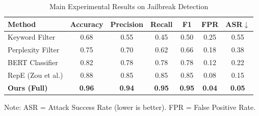 
\begin{table}[h]
\centering
\caption{Main Experimental Results on Jailbreak Detection}
\label{tab:main_results}
\begin{tabular}{lcccccc}
\toprule
\textbf{Method} & \textbf{Accuracy} & \textbf{Precision} & \textbf{Recall} & \textbf{F1} & \textbf{FPR} & \textbf{ASR$\downarrow$} \\
\midrule
Keyword Filter & 0.68 & 0.55 & 0.45 & 0.50 & 0.25 & 0.55 \\
Perplexity Filter & 0.75 & 0.70 & 0.62 & 0.66 & 0.18 & 0.38 \\
BERT Classifier & 0.82 & 0.78 & 0.78 & 0.78 & 0.12 & 0.22 \\
RepE (Zou et al.) & 0.88 & 0.85 & 0.85 & 0.85 & 0.08 & 0.15 \\
\midrule
\textbf{Ours (Full)} & \textbf{0.96} & \textbf{0.94} & \textbf{0.95} & \textbf{0.95} & \textbf{0.04} & \textbf{0.05} \\
\bottomrule
\end{tabular}
\vspace{2mm}
\footnotesize{Note: ASR = Attack Success Rate (lower is better). FPR = False Positive Rate.}
\end{table}
